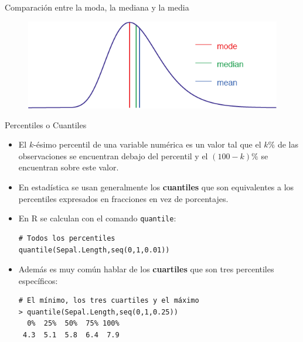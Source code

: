 \documentclass[handout]{beamer}
\begin{document}
\begin{frame}{Comparación entre la moda, la mediana y la media}
 
 \begin{figure}[h!]
	\centering
	\includegraphics[scale=0.5]{imagenes/centrales.png}
	
	
\end{figure}
 
\end{frame}







\begin{frame}[fragile]{Percentiles o Cuantiles}
\scriptsize{
\begin{itemize}
 \item El $k$-ésimo percentil de una variable numérica es un valor tal que el $k\%$ de las observaciones se encuentran debajo del percentil y el $(100-k)\%$ se encuentran sobre este valor.
 
 \item En estadística se usan generalmente los \textbf{cuantiles} que son equivalentes a los percentiles expresados en fracciones en vez de porcentajes.
 
 \item En R se calculan con el comando \verb+quantile+:
 \begin{verbatim}
# Todos los percentiles
quantile(Sepal.Length,seq(0,1,0.01))
 \end{verbatim}

 
 \item Además es muy común hablar de los \textbf{cuartiles} que son tres percentiles específicos: 
 
\begin{verbatim}
# El mínimo, los tres cuartiles y el máximo
> quantile(Sepal.Length,seq(0,1,0.25))
  0%  25%  50%  75% 100% 
 4.3  5.1  5.8  6.4  7.9  
\end{verbatim}

 
\end{itemize}

}

 
\end{frame}
\end{document}
